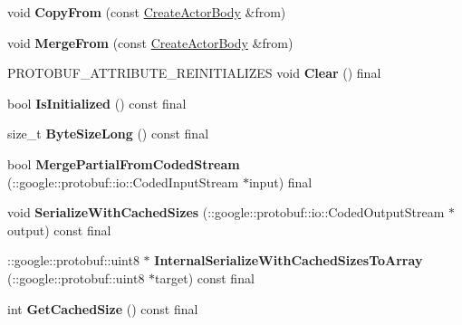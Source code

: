 \begin{DoxyCompactItemize}
void {\bfseries Copy\+From} (const \hyperlink{classtbBasics_1_1CreateActorBody}{Create\+Actor\+Body} \&from)
\item 
\mbox{\label{classtbBasics_1_1CreateActorBody_a893e4164a9749ab481e5f463f6695b91}} 
void {\bfseries Merge\+From} (const \hyperlink{classtbBasics_1_1CreateActorBody}{Create\+Actor\+Body} \&from)
\item 
\mbox{\label{classtbBasics_1_1CreateActorBody_a454713a2ad9dd185c6998bdd20b80c14}} 
P\+R\+O\+T\+O\+B\+U\+F\+\_\+\+A\+T\+T\+R\+I\+B\+U\+T\+E\+\_\+\+R\+E\+I\+N\+I\+T\+I\+A\+L\+I\+Z\+ES void {\bfseries Clear} () final
\item 
\mbox{\label{classtbBasics_1_1CreateActorBody_ada053422e783353b081e32922bd596e1}} 
bool {\bfseries Is\+Initialized} () const final
\item 
\mbox{\label{classtbBasics_1_1CreateActorBody_afffd08653ca7275be758f9c21efa78b3}} 
size\+\_\+t {\bfseries Byte\+Size\+Long} () const final
\item 
\mbox{\label{classtbBasics_1_1CreateActorBody_a58275a21c782e394b9a6e72c27890e93}} 
bool {\bfseries Merge\+Partial\+From\+Coded\+Stream} (\+::google\+::protobuf\+::io\+::\+Coded\+Input\+Stream $\ast$input) final
\item 
\mbox{\label{classtbBasics_1_1CreateActorBody_a4786109ab6492d6136cc01f2930a58b9}} 
void {\bfseries Serialize\+With\+Cached\+Sizes} (\+::google\+::protobuf\+::io\+::\+Coded\+Output\+Stream $\ast$output) const final
\item 
\mbox{\label{classtbBasics_1_1CreateActorBody_af95810c32088b0cf88a871726d992482}} 
\+::google\+::protobuf\+::uint8 $\ast$ {\bfseries Internal\+Serialize\+With\+Cached\+Sizes\+To\+Array} (\+::google\+::protobuf\+::uint8 $\ast$target) const final
\item 
\mbox{\label{classtbBasics_1_1CreateActorBody_a13687241e582a665c14e0d164bced45e}} 
int {\bfseries Get\+Cached\+Size} () const final

\end{DoxyCompactItemize}
